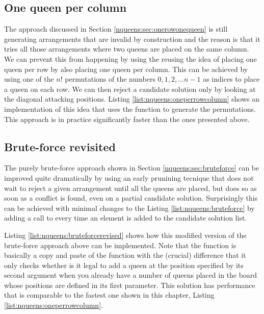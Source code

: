 \subsection{One queen per column}
\label{nqueens:sec:onequeenpercolumn}
The approach discussed in Section \ref{nqueens:sec:onerowonequeen} is still 
generating arrangements that are invalid by construction and the reason is that
it tries all those arrangements where two queens are placed on the same column. 
We can prevent this from happening by using the reusing the idea of placing one queen per row
by also placing one queen per column. This can be achieved by using 
one of the $n!$ permutations of the numbers  $0,1,2,\ldots n-1$ as indices to place a queen on each row.
We can then reject a candidate solution only by looking at the diagonal attacking positions. 
Listing \ref{list:nqueens:oneperrowcolumn} shows an implementation of this idea that uses the 
 function to generate the permutations.
This approach is in practice significantly faster than the ones presented above.





\subsection{Brute-force revisited}
\label{nqueens:sec:bruteforcerevisited}
The purely brute-force approach shown in Section \ref{nqueens:sec:bruteforce} can be improved quite dramatically by using an early prunining tecnique that
does not wait to reject a given arrangement until all the queens are placed, but does so as soon as a conflict is found, even on a partial candidate solution.
Surprisingly this can be achieved with minimal changes to the Listing \ref{list:nqueens:bruteforce} by adding a call to 
 every time an element is added to the candidate solution list.

Listing \ref{list:nqueens:bruteforcerevised} shows how this modified version of the brute-force approach above can be implemented.
Note that the function  is basically a copy and paste of the function  with the (crucial)
difference that it only checks whether is it legal to add a queen at the position specified by its second argument when you already have a number of queens placed in the board whose positions are defined in its first parameter.
This solution has performance that is comparable to the fastest one shown in this chapter, Listing \ref{list:nqueens:oneperrowcolumn}.

